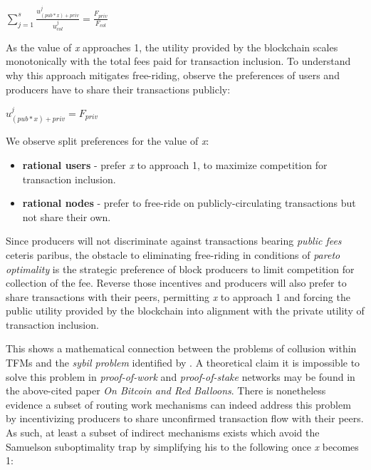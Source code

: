 \documentclass[oneside]{article}   	%
\begin{document}
\LARGE
\begin{adjustwidth}{1.5em}{1.5em}
\begin{math}
\sum_{j=1}^{s} \frac{u_{({pub}*{x})+{priv}}^j}{u_{col}^j} = \frac{F_{{priv}}}{F_{col}}
\end{math}
\end{adjustwidth}
\normalsize

As the value of \textit{x} approaches 1, the utility provided by the blockchain scales monotonically with the total fees paid for transaction inclusion. To understand why this approach mitigates free-riding, observe the preferences of users and producers have to share their transactions publicly:

\LARGE
\begin{adjustwidth}{1.5em}{1.5em}
\begin{math}
u_{\left({pub}*{x}\right)+{priv}}^j = F_{priv}
\end{math}
\end{adjustwidth}
\normalsize

We observe split preferences for the value of \textit{x}:

\begin{itemize}
  \item \textbf{rational users} - prefer \textit{x} to approach 1, to maximize competition for transaction inclusion.
  \item \textbf{rational nodes} - prefer to free-ride on publicly-circulating transactions but not share their own.
\end{itemize}

Since producers will not discriminate against transactions bearing \textit{public fees} ceteris paribus, the obstacle to eliminating free-riding in conditions of \textit{pareto optimality} is the strategic preference of block producers to limit competition for collection of the fee. Reverse those incentives and producers will also prefer to share transactions with their peers, permitting \textit{x} to approach 1 and forcing the public utility provided by the blockchain into alignment with the private utility of transaction inclusion.

This shows a mathematical connection between the problems of collusion within TFMs and the \textit{sybil problem} identified by \cite{babaioffredballoons}. A theoretical claim it is impossible to solve this problem in \textit{proof-of-work} and \textit{proof-of-stake} networks may be found in the above-cited paper \textit{On Bitcoin and Red Balloons}. There is nonetheless evidence a subset of routing work mechanisms can indeed address this problem by incentivizing producers to share unconfirmed transaction flow with their peers. As such, at least a subset of indirect mechanisms exists which avoid the Samuelson suboptimality trap by simplifying his to the following once \textit{x} becomes 1:
\end{document}
